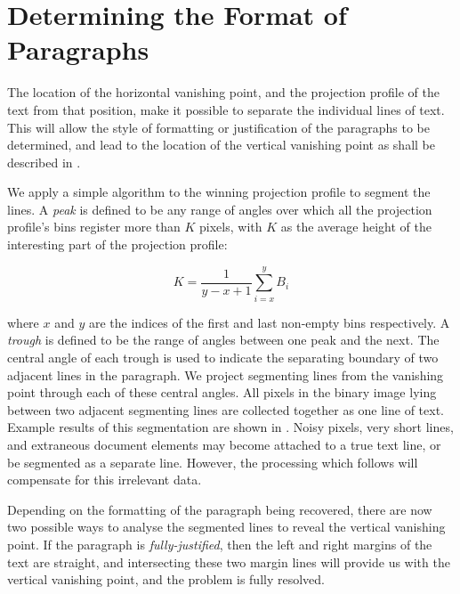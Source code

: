

\section{Determining the Format  of Paragraphs} \label{sec-parags}

The location of the horizontal vanishing point, and the projection profile of
the text from that position, make it possible to separate the individual lines
of text.  This will allow the style of formatting or justification of the
paragraphs to be determined, and lead to the location of the vertical vanishing
point as shall be described in .

We apply a simple algorithm to the winning projection profile to segment the
lines.  A {\em peak} is defined to be any range of angles over which all the
projection profile's bins register more than $K$ pixels, with $K$ as the
average height of the interesting part of the projection profile:

\begin{equation}
K= \frac{1}{y-x+1} \sum_{i=x}^{y}B_i
\end{equation}

{\parindent 0mm
where $x$ and $y$ are the indices of the first and last non-empty bins respectively.
A {\em trough} is defined to be the range of angles between one peak and the next.  
The central angle of each trough is used to indicate the separating boundary of
two adjacent lines in the paragraph.  We project segmenting lines from the
vanishing point through each of these central angles.
All pixels in the binary image lying between two adjacent segmenting
lines are collected together as one line of text. Example results of this
segmentation are shown in .
Noisy pixels, very short lines, and extraneous document
elements may become attached to a true text line, or be segmented as a separate
line.  However, the processing which follows will compensate for this irrelevant
data. 
} 




Depending on the formatting of the paragraph being recovered, there are now two
possible ways to analyse the segmented lines to reveal the vertical vanishing
point.  If the paragraph is {\em fully-justified}, then the left and right
margins of the text are straight, and intersecting these two margin lines will
provide us with the vertical vanishing point, and the problem is fully resolved.

